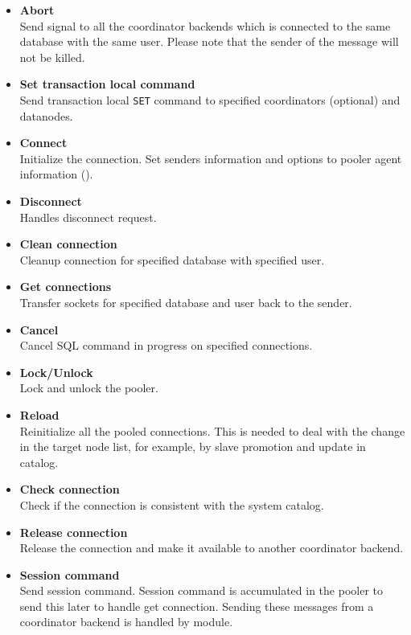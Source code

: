   \begin{itemize}
	  \item \textbf{Abort}\\
		  	Send  signal to all the coordinator backends which is connected to
			the same database with the same user.
			Please note that the sender of the message will not be killed.
	  \item \textbf{Set transaction local command} \\
			Send transaction local \texttt{SET} command to specified coordinators (optional) and
			datanodes.
	  \item \textbf{Connect} \\
			Initialize the connection.
			Set senders information and options to pooler agent information ().
	  \item \textbf{Disconnect} \\
			Handles disconnect request.
	  \item \textbf{Clean connection} \\
			Cleanup connection for specified database with specified user.
	  \item \textbf{Get connections} \\
			Transfer sockets for specified database and user back to the sender.
	  \item \textbf{Cancel} \\
			Cancel SQL command in progress on specified connections.
	  \item \textbf{Lock/Unlock} \\
			Lock and unlock the pooler.
	  \item \textbf{Reload} \\
			Reinitialize all the pooled connections.
			This is needed to deal with the change in the target node list, for example,
			by slave promotion and update in  catalog.
	  \item \textbf{Check connection} \\
			Check if the connection is consistent with the system catalog.
	  \item \textbf{Release connection} \\
			Release the connection and make it available to another coordinator backend.
	  \item \textbf{Session command} \\
			Send session command.
			Session command is accumulated in the pooler to send this later to handle get
			connection.
			Sending these messages from a coordinator backend is handled by 
			module.
  \end{itemize}


